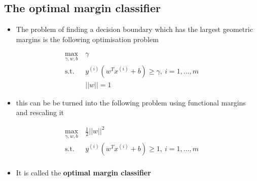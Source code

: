 \documentclass[11pt]{article}
\begin{document}
\subsection{The optimal margin classifier}
\label{sec:org29d7950}
\begin{itemize}
\item The problem of finding a decision boundary which has the largest geometric margins is the following optimisation problem
\end{itemize}
\begin{equation}
  \begin{split} 
    \max_{\gamma,w,b} \ &\gamma\\
    \text{s.t.} \ & y^{(i)}(w^Tx^{(i)}+b) \geq \gamma, \ i= 1, \dots, m \\
    &||w|| = 1
  \end{split}
\end{equation}
\begin{itemize}
\item this can be be turned into the following problem using functional margins and rescaling it
\end{itemize}
\begin{equation}
  \begin{split} 
   \max_{\gamma,w,b} \ &\frac12 ||w||^2\\ 
    \text{s.t.} \ & y^{(i)}(w^Tx^{(i)}+b) \geq 1, \ i= 1, \dots, m \\
  \end{split}
\end{equation}
\begin{itemize}
\item It is called the \textbf{optimal margin classifier}
\end{itemize}
\end{document}
